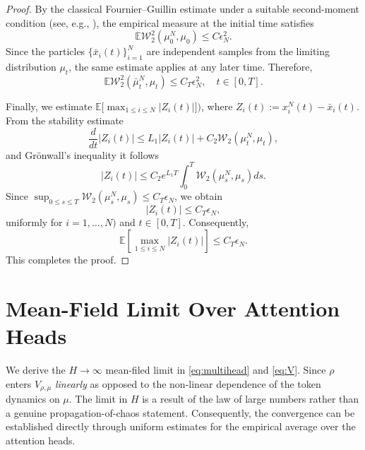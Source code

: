 \documentclass[11pt,a4wide]{article}
\theoremstyle{definition}
\newcommand{\Wass}{\mathcal{W}}
\begin{document}
\begin{proof}
By the classical Fournier--Guillin estimate under a suitable second-moment condition (see, e.g., \cite{fournier2015rate}), the empirical measure at the initial time satisfies
$$
\mathbb{E} \Wass_2^2( \mu_0^N,\mu_0)\leq C\epsilon_N^2.
$$
Since the particles $\{\bar{x}_i(t)\}_{i=1}^N$ are independent samples from the limiting distribution $\mu_t$, the same estimate applies at any later time. Therefore,
$$
\mathbb{E} \Wass_2^2( \bar \mu_t^N,\mu_t)\leq C_T \epsilon_N^2, \quad t\in [0, T]. 
$$

Finally, we estimate $\mathbb{E} \bigl[\max_{1\le i\le N}|Z_i(t)|\bigr])$, where $
Z_i(t):=x_i^N(t)-\bar{x}_i(t).$ From the stability estimate
$$
\frac{d}{dt}|Z_i(t)|
\le
L_1 |Z_i(t)|
+
C_2 \Wass_2(\mu_t^N,\mu_t),
$$
and   Grönwall's inequality it follows
$$
|Z_i(t)|
\le
C_2e^{L_1T}
\int_0^T
\Wass_2(\mu_s^N,\mu_s)ds.
$$
Since $\sup_{0 \le s \le T}\Wass_2(\mu_s^N,\mu_s) \le C_T \epsilon_N$,  
we obtain
$$
|Z_i(t)|
\le
C_T \epsilon_N,
$$
uniformly for $i=1,\ldots,N)$ and $t\in [0,T]$. Consequently,
$$
\mathbb{E} \left[\max_{1\le i\le N}|Z_i(t)|\right]
\le
C_T \epsilon_N.
$$
This completes the proof.
\end{proof}

\section{Mean-Field Limit Over Attention Heads}
\label{sec:head-mf}

We derive the $H\to\infty$ mean-filed limit in \eqref{eq:multihead}  and \eqref{eq:V}. Since $\rho$ enters $V_{\rho,\mu}$ \emph{linearly} as opposed to the non-linear dependence of the token dynamics on $\mu$.  The limit in $H$ is a result of the law of large numbers rather than a genuine  propagation-of-chaos statement.%
Consequently, the convergence can be established directly through uniform estimates for the empirical average over the attention heads. 
\end{document}
